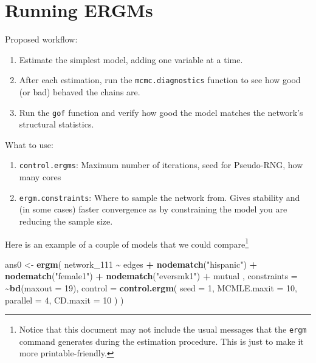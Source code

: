 \documentclass[
]{book}
\newenvironment{Shaded}{\begin{snugshade}}{\end{snugshade}}
\newcommand{\AttributeTok}[1]{\textcolor[rgb]{0.13,0.29,0.53}{#1}}
\newcommand{\DecValTok}[1]{\textcolor[rgb]{0.00,0.00,0.81}{#1}}
\newcommand{\FunctionTok}[1]{\textcolor[rgb]{0.13,0.29,0.53}{\textbf{#1}}}
\newcommand{\NormalTok}[1]{#1}
\newcommand{\OtherTok}[1]{\textcolor[rgb]{0.56,0.35,0.01}{#1}}
\newcommand{\SpecialCharTok}[1]{\textcolor[rgb]{0.81,0.36,0.00}{\textbf{#1}}}
\newcommand{\StringTok}[1]{\textcolor[rgb]{0.31,0.60,0.02}{#1}}
\begin{document}
\hypertarget{running-ergms}{%
\section{Running ERGMs}\label{running-ergms}}

Proposed workflow:

\begin{enumerate}
\def\labelenumi{\arabic{enumi}.}
\item
  Estimate the simplest model, adding one variable at a time.
\item
  After each estimation, run the \texttt{mcmc.diagnostics} function to see how good (or bad) behaved the chains are.
\item
  Run the \texttt{gof} function and verify how good the model matches the network's structural statistics.
\end{enumerate}

What to use:

\begin{enumerate}
\def\labelenumi{\arabic{enumi}.}
\item
  \texttt{control.ergms}: Maximum number of iterations, seed for Pseudo-RNG, how many cores
\item
  \texttt{ergm.constraints}: Where to sample the network from. Gives stability and (in some cases) faster convergence as by constraining the model you are reducing the sample size.
\end{enumerate}

Here is an example of a couple of models that we could compare\footnote{Notice that this document may not include the usual messages that the \texttt{ergm} command generates during the estimation procedure. This is just to make it more printable-friendly.}

\begin{Shaded}
\begin{Highlighting}[]
\NormalTok{ans0 }\OtherTok{\textless{}{-}} \FunctionTok{ergm}\NormalTok{(}
\NormalTok{  network\_111 }\SpecialCharTok{\textasciitilde{}}
\NormalTok{    edges }\SpecialCharTok{+}
    \FunctionTok{nodematch}\NormalTok{(}\StringTok{"hispanic"}\NormalTok{) }\SpecialCharTok{+}
    \FunctionTok{nodematch}\NormalTok{(}\StringTok{"female1"}\NormalTok{) }\SpecialCharTok{+}
    \FunctionTok{nodematch}\NormalTok{(}\StringTok{"eversmk1"}\NormalTok{) }\SpecialCharTok{+}
\NormalTok{    mutual}
\NormalTok{    ,}
  \AttributeTok{constraints =} \SpecialCharTok{\textasciitilde{}}\FunctionTok{bd}\NormalTok{(}\AttributeTok{maxout =} \DecValTok{19}\NormalTok{),}
  \AttributeTok{control =} \FunctionTok{control.ergm}\NormalTok{(}
    \AttributeTok{seed        =} \DecValTok{1}\NormalTok{,}
    \AttributeTok{MCMLE.maxit =} \DecValTok{10}\NormalTok{,}
    \AttributeTok{parallel    =} \DecValTok{4}\NormalTok{,}
    \AttributeTok{CD.maxit    =} \DecValTok{10}
\NormalTok{    )}
\NormalTok{  )}
\end{Highlighting}
\end{Shaded}
\end{document}
